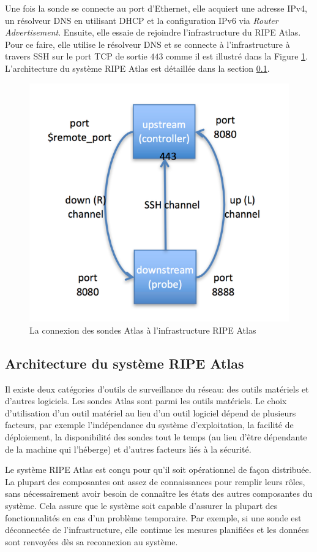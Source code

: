 Une fois la sonde se connecte au port d'Ethernet, elle acquiert  une adresse IPv4, un résolveur DNS  en utilisant DHCP et la configuration IPv6 via \textit{Router Advertisement}. Ensuite, elle essaie de rejoindre l'infrastructure du RIPE Atlas. Pour ce faire, elle utilise le résolveur DNS et se connecte à l'infrastructure à travers SSH sur le port TCP de sortie $443$ comme il est illustré dans la Figure \ref{fig:ssh-atlas-probe}. L'architecture du système RIPE Atlas est détaillée dans la section \ref{subsec:archi-probes}.

\begin{figure}[H]
	\centering
	\captionsetup{justification=centering}
	\includegraphics[width=0.5\linewidth]{illustrations/ssh-atlas-probe}
	\caption{La connexion des sondes Atlas à l'infrastructure RIPE Atlas \cite{how-we-manage-our-probe}}
	\label{fig:ssh-atlas-probe}
\end{figure}

\subsection{Architecture du système RIPE Atlas} \label{subsec:archi-probes}

Il existe deux catégories d'outils de surveillance du réseau: des outils matériels et d'autres logiciels. Les sondes  Atlas sont parmi les outils matériels. Le choix d'utilisation d'un outil matériel au lieu d'un outil logiciel dépend de plusieurs facteurs, par exemple l'indépendance du système d'exploitation, la facilité de déploiement, la disponibilité des sondes tout le temps (au lieu d'être dépendante de la machine qui l'héberge) et d'autres facteurs liés à la sécurité.

Le système RIPE Atlas est conçu pour qu'il soit opérationnel de façon distribuée. La plupart des composantes ont assez de connaissances pour remplir leurs rôles, sans nécessairement avoir besoin de connaître les états des autres composantes du système. Cela assure que le système soit capable d'assurer la plupart des fonctionnalités en cas  d'un problème temporaire. Par exemple, si une sonde est déconnectée de l'infrastructure, elle continue les mesures planifiées et les données sont renvoyées dès sa reconnexion au système.


